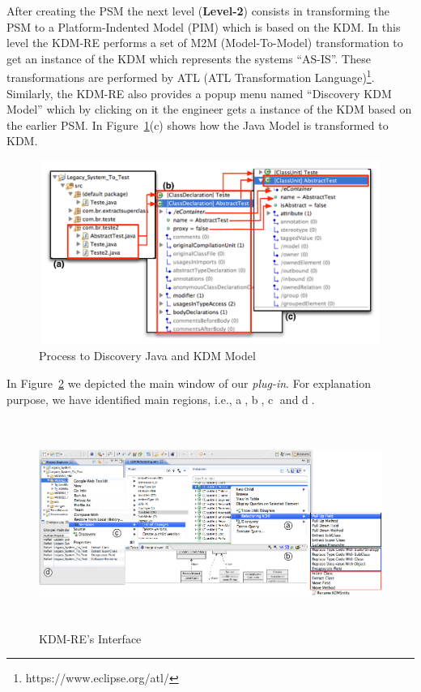 After creating the PSM the next level (\textbf{Level-2}) consists in transforming the PSM to a Platform-Indented Model (PIM) which is based on the KDM. 
In this level the KDM-RE performs a set of M2M (Model-To-Model) transformation to get an instance of the KDM which represents the systems ``AS-IS''. 
These transformations are performed by ATL (ATL Transformation Language)\footnote{https://www.eclipse.org/atl/}.
Similarly, the KDM-RE also provides a popup menu named ``Discovery KDM Model'' which by clicking on it the engineer gets a instance of the KDM based on the earlier PSM.
In Figure~\ref{fig:discovery_java_model}(c) shows how the Java Model is transformed to KDM.

\begin{figure}[!ht]
\centering
  \includegraphics[width=13cm, height=6cm]{figure/GerandoTODOS}
\caption{Process to Discovery Java and KDM Model}
\label{fig:discovery_java_model}
\end{figure}

In Figure~\ref{fig:interface} we depicted the main window of our \textit{plug-in}. 
For explanation purpose, we have identified main regions, i.e., \textcircled{a}, \textcircled{b}, \textcircled{c} and \textcircled{d}.

\begin{figure}[!ht]
\centering
  \includegraphics[width=15cm, height=6.8cm]{figure/ScreenShot_tool}
\caption{KDM-RE's Interface}
\label{fig:interface}
\end{figure}

